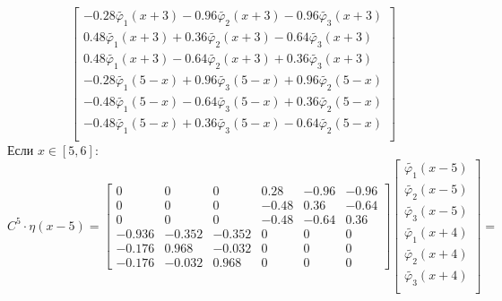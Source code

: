 \documentclass[a4paper, 12pt,fleqn]{extarticle}
\begin{document}
        \[
            \begin{bmatrix}
            -0.28 \tilde{\varphi_1}(x+3) - 0.96 \tilde{\varphi_2}(x+3) - 0.96 \tilde{\varphi_3}(x+3) \\
            0.48 \tilde{\varphi_1}(x+3) + 0.36 \tilde{\varphi_2}(x+3) - 0.64 \tilde{\varphi_3}(x+3) \\
            0.48 \tilde{\varphi_1}(x+3) - 0.64 \tilde{\varphi_2}(x+3) + 0.36 \tilde{\varphi_3}(x+3) \\
            -0.28 \tilde{\varphi_1}(5-x) + 0.96 \tilde{\varphi_3}(5-x) + 0.96 \tilde{\varphi_2}(5-x) \\
            -0.48 \tilde{\varphi_1}(5-x) - 0.64 \tilde{\varphi_3}(5-x) + 0.36 \tilde{\varphi_2}(5-x) \\
            -0.48 \tilde{\varphi_1}(5-x) + 0.36 \tilde{\varphi_3}(5-x) - 0.64 \tilde{\varphi_2}(5-x) \\
            \end{bmatrix}
            \]
            Если $x \in [5,6]$:
            \[C^5\cdot\eta(x-5)=
            \begin{bmatrix}
                    0 & 0 & 0 & 0.28 & -0.96 & -0.96\\
                    0 & 0 & 0 & -0.48 & 0.36 & -0.64\\
                    0 & 0 & 0 & -0.48 & -0.64 & 0.36\\
                    -0.936 & -0.352 & -0.352 & 0 & 0 & 0\\
                    -0.176 & 0.968 & -0.032 & 0 & 0 & 0\\
                    -0.176 & -0.032 & 0.968 & 0 & 0 & 0  
            \end{bmatrix}
            \begin{bmatrix}
                \tilde{\varphi_1}(x-5)\\%
                \tilde{\varphi_2}(x-5)\\%
                \tilde{\varphi_3}(x-5)\\%
                \tilde{\varphi_1}(x+4)\\%
                \tilde{\varphi_2}(x+4)\\%
                \tilde{\varphi_3}(x+4)\\%
            \end{bmatrix}=
            \]
            
\end{document}
